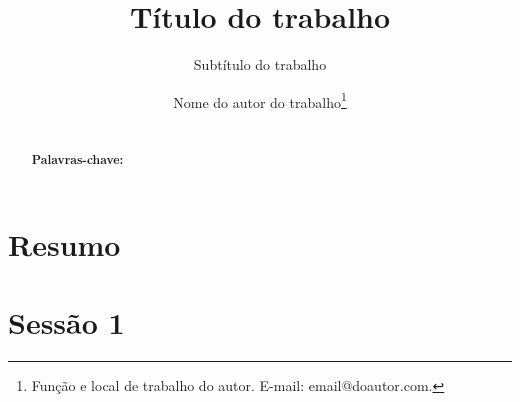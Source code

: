 \documentclass[paper=a4,oneside,fontsize=12pt,parskip=full]{scrartcl}
\title{Título do trabalho}
\subtitle{Subtítulo do trabalho}
\author{Nome do autor do trabalho\footnote{Função e local de trabalho do autor. E-mail: email@doautor.com.}}
\date{}
\begin{document}
	\maketitle

\section*{Resumo}	
\begin{abstract}
	\noindent\lipsum[1]
	\ \\
	\textbf{Palavras-chave:}
\end{abstract}

\section{Sessão 1}
\lipsum[1]

\begin{quote}
\lipsum[1]
\end{quote}
	
\end{document}
